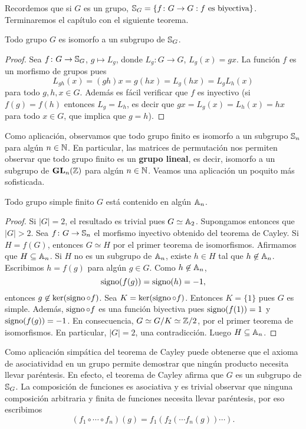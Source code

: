 Recordemos que si $G$ es un grupo, $\mathbb{S}_G=\{f\colon G\to G:f\text{ es biyectiva}\}$. 
Terminaremos el capítulo con el siguiente teorema.

\begin{theorem}[Cayley]
Todo grupo $G$ es isomorfo a un subgrupo de $\mathbb{S}_G$. 
\end{theorem}

\begin{proof}
Sea $f\colon G\to\mathbb{S}_G$, $g\mapsto L_g$, donde $L_g\colon G\to G$, $L_g(x)=gx$. La función $f$ es un morfismo de grupos pues
\[
L_{gh}(x)=(gh)x=g(hx)=L_g(hx)=L_gL_h(x)
\]
para todo $g,h,x\in G$. Además es fácil verificar que $f$ es inyectivo (si $f(g)=f(h)$ entonces $L_g=L_h$, es decir que 
$gx=L_g(x)=L_h(x)=hx$ para todo $x\in G$, que implica que $g=h$). 
\end{proof}

Como aplicación, observamos que todo grupo finito es isomorfo a un subgrupo $\mathbb{S}_n$ para algún $n\in\mathbb{N}$. En particular, las matrices de permutación nos permiten observar que
todo grupo finito es un \textbf{grupo lineal}, es decir, isomorfo a un subgrupo de $\mathbf{GL}_n(\mathbb{Z})$ para algún $n\in\mathbb{N}$. Veamos una aplicación un poquito más sofisticada.
  
\begin{proposition}
Todo grupo simple finito $G$ está contenido en algún $\mathbb{A}_n$.
\end{proposition}

\begin{proof}
Si $|G|=2$, el resultado es trivial pues $G\simeq\mathbb{A}_2$. Supongamos entonces que $|G|>2$.  
Sea $f\colon G\to\mathbb{S}_n$ el morfismo inyectivo obtenido del teorema de Cayley. Si $H=f(G)$, entonces $G\simeq H$ por el primer teorema de isomorfismos. Afirmamos que $H\subseteq\mathbb{A}_n$. Si   
$H$ no es un subgrupo de $\mathbb{A}_n$, existe $h\in H$ tal que $h\not\in\mathbb{A}_n$. Escribimos $h=f(g)$ para algún $g\in G$. Como $h\not\in\mathbb{A}_n$, 
\[
\operatorname{signo}(f(g))=\operatorname{signo}(h)=-1,
\]
entonces $g\not\in\ker(\operatorname{signo}\circ f)$. 
Sea $K=\ker(\operatorname{signo}\circ f)$. Entonces $K=\{1\}$ pues $G$ es simple. Además, $\operatorname{signo}\circ f$ es una función biyectiva pues $\operatorname{signo}(f(1))=1$ y $\operatorname{signo}(f(g))=-1$. En consecuencia,
$G\simeq G/K\simeq\mathbb{Z}/2$, por el primer teorema de isomorfismos.  En particular, $|G|=2$, una contradicción. Luego $H\subseteq\mathbb{A}_n$.        
\end{proof}	

Como aplicación simpática del teorema de Cayley puede obtenerse que el axioma de asociatividad en un grupo permite demostrar
que ningún producto necesita llevar paréntesis.  En efecto, el teorema de Cayley afirma que $G$ es un subgrupo de $\mathbb{S}_G$. 
La composición de funciones es asociativa y es trivial observar que ninguna composición arbitraria y finita de funciones necesita llevar paréntesis, por eso escribimos 
\[
(f_1\circ\cdots\circ f_n)(g)=f_1(f_2(\cdots f_n(g))\cdots).
\]

